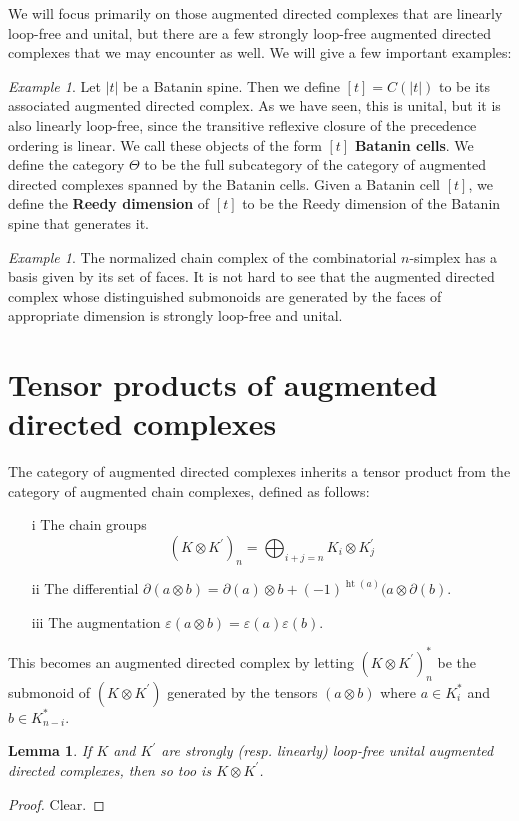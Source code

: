 \documentclass[10pt]{amsart}
\numberwithin{equation}{section}
\theoremstyle{plain}   %
\newtheorem{lemma}[subsection]{Lemma}
\theoremstyle{remark}
\newtheorem{example}[subsection]{Example}
\theoremstyle{plain}
\DeclareMathOperator{\heit}{ht}
\newcommand{\dfn}{\textbf}
\begin{document}
We will focus primarily on those augmented directed complexes that are linearly loop-free and unital, but there are a few strongly loop-free augmented directed complexes that we may encounter as well.  We will give a few important examples:
\begin{example} Let \(|t|\) be a Batanin spine.  Then we define \([t]=C\left(|t|\right)\) to be its associated augmented directed complex.  As we have seen, this is unital, but it is also linearly loop-free, since the transitive reflexive closure of the precedence ordering is linear.  We call these objects of the form \([t]\) \dfn{Batanin cells}.  We define the category \(\Theta\) to be the full subcategory of the category of augmented directed complexes spanned by the Batanin cells.  Given a Batanin cell \([t]\), we define the \dfn{Reedy dimension} of \([t]\) to be the Reedy dimension of the Batanin spine that generates it.
\end{example}
\begin{example} The normalized chain complex of the combinatorial \(n\)-simplex has a basis given by its set of faces.  It is not hard to see that the augmented directed complex whose distinguished submonoids are generated by the faces of appropriate dimension is strongly loop-free and unital.   
\end{example}
\section{Tensor products of augmented directed complexes}
The category of augmented directed complexes inherits a tensor product from the category of augmented chain complexes, defined as follows:
\begin{enumerate}
\item[i] The chain groups\[(K\otimes K^\prime)_n=\bigoplus_{i+j=n} K_i\otimes K^\prime_j\]
\item[ii] The differential \(\partial(a\otimes b)=\partial(a)\otimes b + (-1)^{\heit(a)}(a\otimes \partial(b)\).
\item[iii] The augmentation \(\varepsilon(a\otimes b)=\varepsilon(a)\varepsilon(b)\).
\end{enumerate}
This becomes an augmented directed complex by letting \((K\otimes K^\prime)_n^\ast\) be the submonoid of \((K\otimes K^\prime)\) generated by the tensors \((a\otimes b)\) where \(a\in K_i^\ast\) and \(b\in K_{n-i}^\ast\).
\begin{lemma} If \(K\) and \(K^\prime\) are strongly (resp. linearly) loop-free unital augmented directed complexes, then so too is \(K\otimes K^\prime\).  
\end{lemma}
\begin{proof} Clear.
\end{proof}
\end{document}
